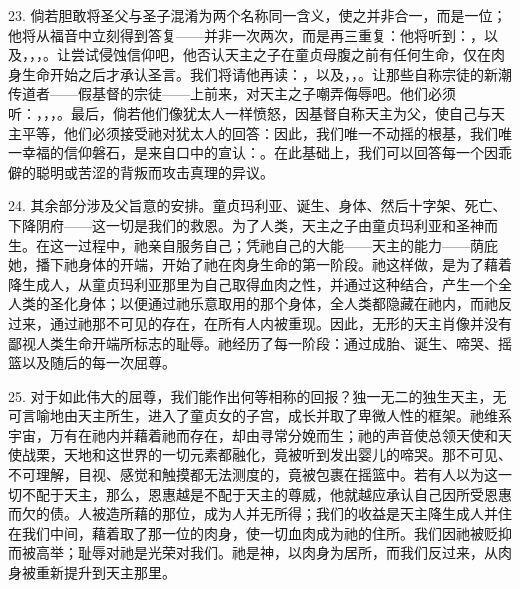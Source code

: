 23. 倘若胆敢将圣父与圣子混淆为两个名称同一含义，使之并非合一，而是一位；他将从福音中立刻得到答复——并非一次两次，而是再三重复：他将听到：，以及，，，。让尝试侵蚀信仰吧，他否认天主之子在童贞母腹之前有任何生命，仅在肉身生命开始之后才承认圣言。我们将请他再读：，以及，，。让那些自称宗徒的新潮传道者——假基督的宗徒——上前来，对天主之子嘲弄侮辱吧。他们必须听：，，，。最后，倘若他们像犹太人一样愤怒，因基督自称天主为父，使自己与天主平等，他们必须接受祂对犹太人的回答：因此，我们唯一不动摇的根基，我们唯一幸福的信仰磐石，是来自口中的宣认：。在此基础上，我们可以回答每一个因乖僻的聪明或苦涩的背叛而攻击真理的异议。\par

24. 其余部分涉及父旨意的安排。童贞玛利亚、诞生、身体、然后十字架、死亡、下降阴府——这一切是我们的救恩。为了人类，天主之子由童贞玛利亚和圣神而生。在这一过程中，祂亲自服务自己；凭祂自己的大能——天主的能力——荫庇她，播下祂身体的开端，开始了祂在肉身生命的第一阶段。祂这样做，是为了藉着降生成人，从童贞玛利亚那里为自己取得血肉之性，并通过这种结合，产生一个全人类的圣化身体；以便通过祂乐意取用的那个身体，全人类都隐藏在祂内，而祂反过来，通过祂那不可见的存在，在所有人内被重现。因此，无形的天主肖像并没有鄙视人类生命开端所标志的耻辱。祂经历了每一阶段：通过成胎、诞生、啼哭、摇篮以及随后的每一次屈尊。\par

25. 对于如此伟大的屈尊，我们能作出何等相称的回报？独一无二的独生天主，无可言喻地由天主所生，进入了童贞女的子宫，成长并取了卑微人性的框架。祂维系宇宙，万有在祂内并藉着祂而存在，却由寻常分娩而生；祂的声音使总领天使和天使战栗，天地和这世界的一切元素都融化，竟被听到发出婴儿的啼哭。那不可见、不可理解，目视、感觉和触摸都无法测度的，竟被包裹在摇篮中。若有人以为这一切不配于天主，那么，恩惠越是不配于天主的尊威，他就越应承认自己因所受恩惠而欠的债。人被造所藉的那位，成为人并无所得；我们的收益是天主降生成人并住在我们中间，藉着取了那一位的肉身，使一切血肉成为祂的住所。我们因祂被贬抑而被高举；耻辱对祂是光荣对我们。祂是神，以肉身为居所，而我们反过来，从肉身被重新提升到天主那里。\par

